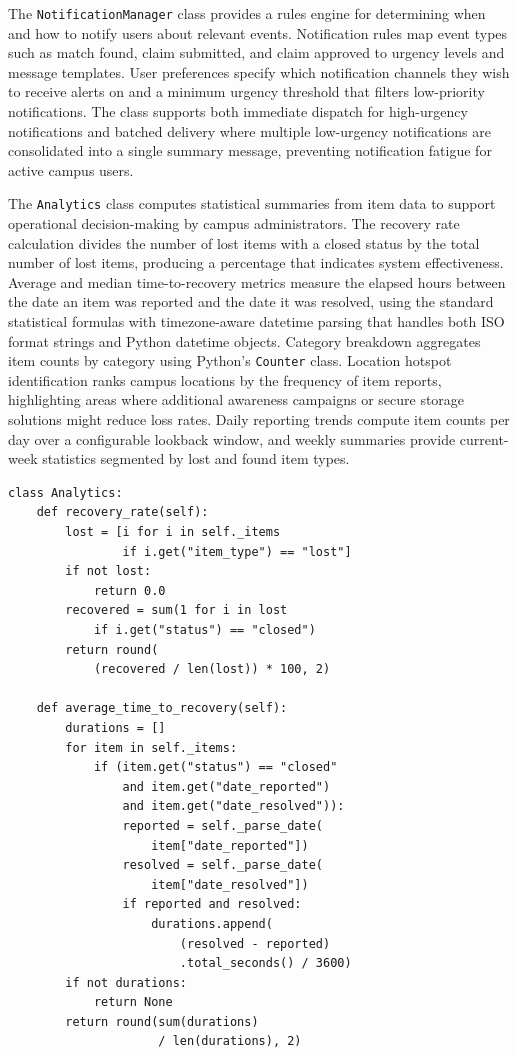 \documentclass[conference]{IEEEtran}
\begin{document}
The \texttt{NotificationManager} class provides a rules engine for determining when and how to notify users about relevant events. Notification rules map event types such as match found, claim submitted, and claim approved to urgency levels and message templates. User preferences specify which notification channels they wish to receive alerts on and a minimum urgency threshold that filters low-priority notifications. The class supports both immediate dispatch for high-urgency notifications and batched delivery where multiple low-urgency notifications are consolidated into a single summary message, preventing notification fatigue for active campus users.

The \texttt{Analytics} class computes statistical summaries from item data to support operational decision-making by campus administrators. The recovery rate calculation divides the number of lost items with a closed status by the total number of lost items, producing a percentage that indicates system effectiveness. Average and median time-to-recovery metrics measure the elapsed hours between the date an item was reported and the date it was resolved, using the standard statistical formulas with timezone-aware datetime parsing that handles both ISO format strings and Python datetime objects. Category breakdown aggregates item counts by category using Python's \texttt{Counter} class. Location hotspot identification ranks campus locations by the frequency of item reports, highlighting areas where additional awareness campaigns or secure storage solutions might reduce loss rates. Daily reporting trends compute item counts per day over a configurable lookback window, and weekly summaries provide current-week statistics segmented by lost and found item types.

\begin{lstlisting}[caption={Analytics recovery rate and time-to-recovery}]
class Analytics:
    def recovery_rate(self):
        lost = [i for i in self._items
                if i.get("item_type") == "lost"]
        if not lost:
            return 0.0
        recovered = sum(1 for i in lost
            if i.get("status") == "closed")
        return round(
            (recovered / len(lost)) * 100, 2)

    def average_time_to_recovery(self):
        durations = []
        for item in self._items:
            if (item.get("status") == "closed"
                and item.get("date_reported")
                and item.get("date_resolved")):
                reported = self._parse_date(
                    item["date_reported"])
                resolved = self._parse_date(
                    item["date_resolved"])
                if reported and resolved:
                    durations.append(
                        (resolved - reported)
                        .total_seconds() / 3600)
        if not durations:
            return None
        return round(sum(durations)
                     / len(durations), 2)
\end{lstlisting}
\end{document}
